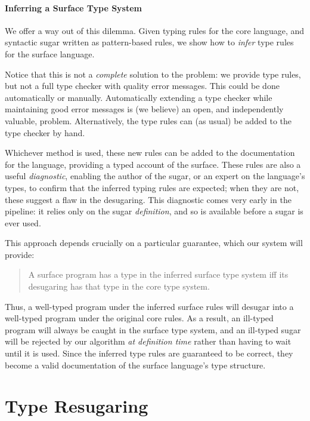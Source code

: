 \paragraph{Inferring a Surface Type System}

We offer a way out of this dilemma. Given typing rules for the core
language, and syntactic sugar written as pattern-based rules, we show
how to \emph{infer} type rules for the surface language.

Notice that this is not a \emph{complete} solution to the problem: we
provide type rules, but not a full type checker with quality error
messages. This could be done automatically or manually.
Automatically extending a type checker while maintaining good error
messages is (we believe) an open, and independently valuable, problem.
Alternatively, the type rules can (as usual) be added to the type
checker by hand.

Whichever method is used, these new rules can be
added to the documentation for the language, providing a typed account
of the surface. These rules are also a useful \emph{diagnostic},
enabling the author of the sugar, or an expert on the language's
types, to confirm that the inferred typing rules are expected; when
they are not, these suggest a flaw in the desugaring. This diagnostic
comes very early in the pipeline: it relies only on the sugar
\emph{definition}, and so is available before a sugar is ever used.

This approach depends crucially on a particular guarantee, which our
system will provide:
\begin{quotation}
  A surface program has a type in the inferred surface type
  system iff its desugaring has that type in the core type system.
\end{quotation}
Thus, a well-typed program under the inferred surface rules
will desugar into a well-typed program under the original core rules.
As a result, an ill-typed program will always be caught in the surface
type system, and an ill-typed sugar will be rejected by our
algorithm \emph{at definition time} rather than having to wait until
it is used. Since the inferred type rules are guaranteed to be correct,
they become a valid documentation of the
surface language's type structure.

\section{Type Resugaring} \label{sec:rtype-walkthrough}


